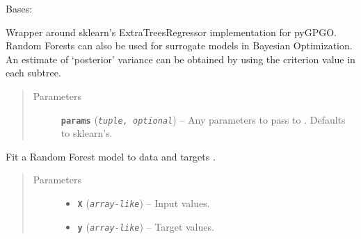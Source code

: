 \documentclass[letterpaper,10pt,english]{sphinxmanual}
\begin{document}
\begin{fulllineitems}
\label{pyGPGO.surrogates.RandomForest:pyGPGO.surrogates.RandomForest.ExtraForest}
Bases: \href{https://docs.python.org/2/library/functions.html\#object}{}

Wrapper around sklearn's ExtraTreesRegressor implementation for pyGPGO.
Random Forests can also be used for surrogate models in Bayesian Optimization.
An estimate of `posterior' variance can be obtained by using the 
criterion value in each subtree.
\begin{quote}\begin{description}
\item[{Parameters}] \leavevmode
\textbf{\texttt{params}} (\emph{\texttt{tuple, optional}}) -- Any parameters to pass to . Defaults to sklearn's.

\end{description}\end{quote}

\begin{fulllineitems}
\label{pyGPGO.surrogates.RandomForest:pyGPGO.surrogates.RandomForest.ExtraForest.fit}
Fit a Random Forest model to data  and targets .
\begin{quote}\begin{description}
\item[{Parameters}] \leavevmode\begin{itemize}
\item {} 
\textbf{\texttt{X}} (\emph{\texttt{array-like}}) -- Input values.

\item {} 
\textbf{\texttt{y}} (\emph{\texttt{array-like}}) -- Target values.

\end{itemize}

\end{description}\end{quote}

\end{fulllineitems}



\end{fulllineitems}
\end{document}
